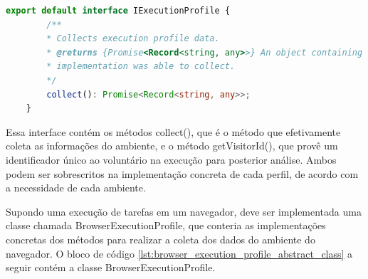 \documentclass[12pt]{tcc}
\begin{document}
	\begin{lstlisting}[label={lst:execution_profile_abstract_class}, caption={Implementação da classe responsável por representar um perfil de execução.}, language=TypeScript, breaklines=true]
	export default interface IExecutionProfile {
		/**
		* Collects execution profile data.
		* @returns {Promise<Record<string, any>>} An object containing every execution profile data the
		* implementation was able to collect.
		*/
		collect(): Promise<Record<string, any>>;
	}
	\end{lstlisting}

	Essa interface contém os métodos collect(), que é o método que efetivamente coleta as informações do ambiente, e o método getVisitorId(), que provê um identificador único ao voluntário na execução para posterior análise. Ambos podem ser sobrescritos na implementação concreta de cada perfil, de acordo com a necessidade de cada ambiente.

	Supondo uma execução de tarefas em um navegador, deve ser implementada uma classe chamada BrowserExecutionProfile, que conteria as implementações concretas dos métodos para realizar a coleta dos dados do ambiente do navegador. O bloco de código \ref{lst:browser_execution_profile_abstract_class} a seguir contém a classe BrowserExecutionProfile.
\end{document}

